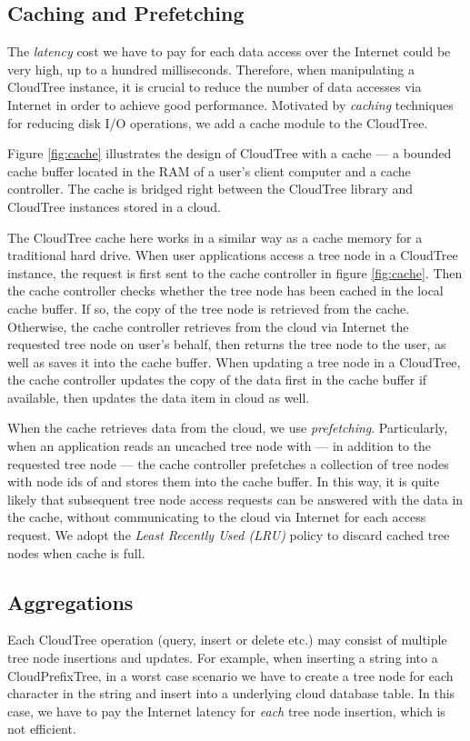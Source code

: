\documentclass[10pt, conference, compsocconf]{IEEEtran}
\begin{document}
\subsection{Caching and Prefetching}
\label{cache}
The \emph{latency} cost we have to pay for each data access over the Internet could be very high, up to a hundred milliseconds. 
Therefore, when manipulating a CloudTree instance, it is crucial to reduce the number of data accesses via Internet
in order to achieve good performance.
Motivated by \emph{caching} techniques for reducing disk I/O operations, 
we add a cache module to the CloudTree.

Figure \ref{fig:cache} illustrates the design of CloudTree with a cache --- a bounded cache buffer located in the RAM of a user's client computer and
a cache controller.
The cache is bridged right between the CloudTree library and CloudTree instances stored in a cloud. 


The CloudTree cache here works in a similar way as a cache memory for a traditional hard drive.
When user applications access a tree node in a CloudTree instance, 
the request is first sent to the cache controller in figure \ref{fig:cache}.  
Then the cache controller checks whether the tree node has been cached in the local cache buffer.
If so, the copy of the tree node is retrieved from the cache. Otherwise, 
the cache controller retrieves from the cloud via Internet the requested tree node on user's behalf, 
then returns the tree node to the user, as well as saves it into the cache buffer.
When updating a tree node in a CloudTree, the cache controller updates the copy of the data first 
in the cache buffer if available, then updates the data item in cloud as well.

When the cache retrieves data from the cloud, we use \emph{prefetching}.
Particularly, when an application reads an uncached tree node with  --- 
in addition to the requested tree node  --- the cache controller prefetches a collection of tree nodes
with node ids of  and stores them into the cache buffer.
In this way, it is quite likely that subsequent tree node access requests can be answered with the data
in the cache, without communicating to the cloud via Internet for each access request.
We adopt the \emph{Least Recently Used (LRU)}  policy \cite{LRU12} to discard cached tree nodes when cache is full.

\subsection{Aggregations}
Each CloudTree operation (query, insert or delete etc.) may consist of multiple tree node insertions and updates.
For example, when inserting a string into a CloudPrefixTree, 
in a worst case scenario we have to create a tree node for each character in the string and insert into a underlying cloud database table.
In this case, we have to pay the Internet latency for \emph{each} tree node insertion, which is not efficient.
\end{document}
